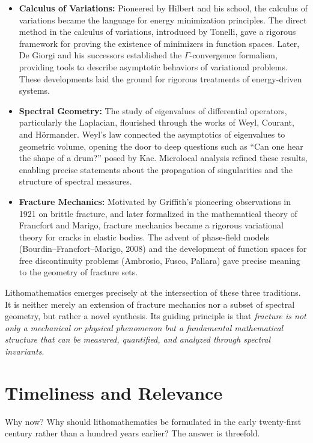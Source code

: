 \begin{itemize}
  \item \textbf{Calculus of Variations:} Pioneered by Hilbert and his school,
  the calculus of variations became the language for energy minimization
  principles. The direct method in the calculus of variations, introduced by
  Tonelli, gave a rigorous framework for proving the existence of minimizers in
  function spaces. Later, De Giorgi and his successors established the
  $\Gamma$-convergence formalism, providing tools to describe asymptotic
  behaviors of variational problems. These developments laid the ground for
  rigorous treatments of energy-driven systems.

  \item \textbf{Spectral Geometry:} The study of eigenvalues of differential
  operators, particularly the Laplacian, flourished through the works of
  Weyl, Courant, and Hörmander. Weyl’s law connected the asymptotics of
  eigenvalues to geometric volume, opening the door to deep questions such as
  “Can one hear the shape of a drum?” posed by Kac. Microlocal analysis
  refined these results, enabling precise statements about the propagation of
  singularities and the structure of spectral measures.

  \item \textbf{Fracture Mechanics:} Motivated by Griffith’s pioneering
  observations in 1921 on brittle fracture, and later formalized in the
  mathematical theory of Francfort and Marigo, fracture mechanics became a
  rigorous variational theory for cracks in elastic bodies. The advent of
  phase-field models (Bourdin–Francfort–Marigo, 2008) and the development of
  function spaces for free discontinuity problems (Ambrosio, Fusco, Pallara)
  gave precise meaning to the geometry of fracture sets.
\end{itemize}

Lithomathematics emerges precisely at the intersection of these three
traditions. It is neither merely an extension of fracture mechanics nor a
subset of spectral geometry, but rather a novel synthesis. Its guiding
principle is that \emph{fracture is not only a mechanical or physical
phenomenon but a fundamental mathematical structure that can be measured,
quantified, and analyzed through spectral invariants.}

\bigskip

\section*{Timeliness and Relevance}
Why now? Why should lithomathematics be formulated in the early twenty-first
century rather than a hundred years earlier? The answer is threefold.

